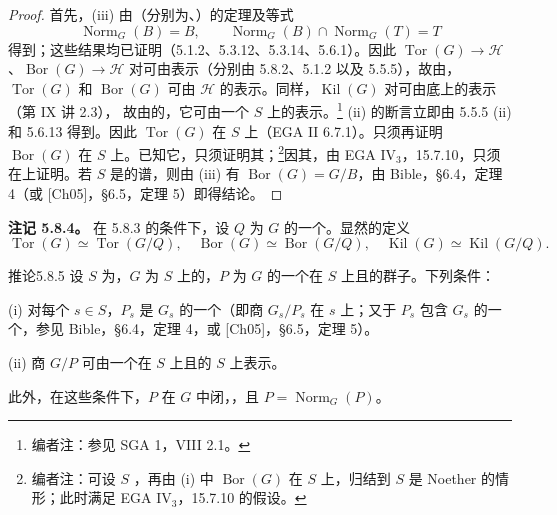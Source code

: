 \begin{proof}
首先，(iii) 由（分别为、）的定理及等式
\[\operatorname{Norm}_G(B)=B,\qquad\operatorname{Norm}_G(B)\cap\operatorname{Norm}_G(T)=T\]
得到；这些结果均已证明（5.1.2、5.3.12、5.3.14、5.6.1）。因此 $\operatorname{Tor}(G)\to\mathcal H$、$\operatorname{Bor}(G)\to\mathcal H$ 对可由表示（分别由 5.8.2、5.1.2 以及 5.5.5），故由，$\operatorname{Tor}(G)$ 和 $\operatorname{Bor}(G)$ 可由 $\mathcal H$ 的表示。同样，$\operatorname{Kil}(G)$ 对可由底上的表示（第 IX 讲 2.3），
故由的，它可由一个 $S$ 上的表示。\footnote{编者注：参见 SGA 1，VIII 2.1。}
(ii) 的断言立即由 5.5.5 (ii) 和 5.6.13 得到。因此 $\operatorname{Tor}(G)$ 在 $S$ 上（EGA II 6.7.1）。只须再证明 $\operatorname{Bor}(G)$ 在 $S$ 上。已知它，只须证明其；\footnote{编者注：可设 $S$ ，再由 (i) 中 $\operatorname{Bor}(G)$ 在 $S$ 上，归结到 $S$ 是 Noether 的情形；此时满足 EGA IV$_3$，15.7.10 的假设。}因其，由 EGA IV$_3$，15.7.10，只须在上证明。若 $S$ 是的谱，则由 (iii) 有 $\operatorname{Bor}(G)=G/B$，由 Bible，\S 6.4，定理 4（或 [Ch05]，\S 6.5，定理 5）即得结论。
\end{proof}
\textbf{注记 5.8.4。} 在 5.8.3 的条件下，设 $Q$ 为 $G$ 的一个。显然的定义
\[\operatorname{Tor}(G)\simeq\operatorname{Tor}(G/Q),\quad
\operatorname{Bor}(G)\simeq\operatorname{Bor}(G/Q),\quad
\operatorname{Kil}(G)\simeq\operatorname{Kil}(G/Q).\]
\begin{SGAresult}{推论}{5.8.5}
设 $S$ 为，$G$ 为 $S$ 上的，$P$ 为 $G$ 的一个在 $S$ 上且的群子。下列条件：

(i) 对每个 $s\in S$，$P_s$ 是 $G_s$ 的一个（即商 $G_s/P_s$ 在 $s$ 上；又于 $P_s$ 包含 $G_s$ 的一个，参见 Bible，\S 6.4，定理 4，或 [Ch05]，\S 6.5，定理 5）。

(ii) 商 $G/P$ 可由一个在 $S$ 上且的 $S$ 上表示。

此外，在这些条件下，$P$ 在 $G$ 中闭，，且 $P=\operatorname{Norm}_G(P)$。
\end{SGAresult}
